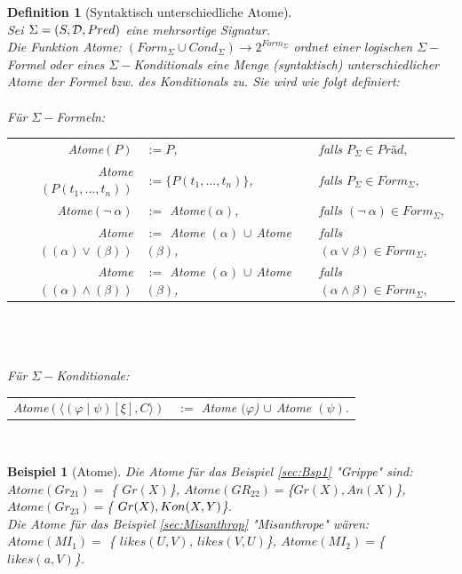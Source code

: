 \documentclass[draft]{scrreprt}
\newtheorem{Def}{Definition }[section]
\newtheorem{Bsp}{Beispiel}[section]
\begin{document}
\begin{Def}[Syntaktisch unterschiedliche Atome]\cite[Kap. 6.2., \\S. 131/132, Def. 6.2.12]{Fis10}\\
Sei $ \Sigma = (S, {\cal D}, Pred) $ eine mehrsortige Signatur.\\
Die Funktion Atome: $ (Form_{\Sigma} \cup Cond_{\Sigma}) \rightarrow 2^{Form_{\Sigma}}$ ordnet einer logischen $ \Sigma- $Formel oder eines $ \Sigma- $Konditionals eine Menge (syntaktisch) unterschiedlicher Atome der Formel bzw. des Konditionals zu.
Sie wird wie folgt definiert:\\
\\Für $ \Sigma- $Formeln: 

\begin{tabular}{rll}
Atome$ (P) $ & $ := {P} $, & falls $ P_{\Sigma} \in Präd,$ \\
Atome$ (P(t_1, ..., t_n)) $ & $ := \{P(t_1, ..., t_n)\} $, & falls $ P_{\Sigma} \in Form_{\Sigma},$ \\
Atome$ (\neg ~ \alpha) $ & $ := $ Atome$ (\alpha) $, & falls $ (\neg ~ \alpha) \in Form_{\Sigma},$ \\
Atome$ ((\alpha) \vee (\beta)) $ & $ := $ Atome $ (\alpha) $  $ \cup$ Atome $ (\beta) $, & falls $ (\alpha \vee \beta) \in Form_{\Sigma},$ \\
Atome$ ((\alpha) \wedge (\beta)) $ & $ := $ Atome $ (\alpha) $  $ \cup$ Atome $ (\beta) $, & falls $ (\alpha \wedge \beta) \in Form_{\Sigma},$ \\
\end{tabular}\\ 
\\
\\
Für $ \Sigma- $Konditionale:

\begin{tabular}{rl}
Atome$(  \langle (\varphi \mid \psi)[\xi], C \rangle) $ & $ :=   $ Atome $ (\varphi$) $ \cup $  Atome $ (\psi ).$ \\
\end{tabular}
\\
\end{Def}


\begin{Bsp}[Atome]
Die Atome für das Beispiel \ref{sec:Bsp1} "{}Grippe"{}  sind:\\
$ Atome(Gr_{21}) = $  \{ $Gr(X) $\}, $ Atome(GR_{22}) = $\{$Gr(X), An(X)$\},  $Atome(Gr_{23}) = $\{ $Gr(X), \\ Kon(X, Y) $\}. \\

Die Atome für das Beispiel \ref{sec:Misanthrop} "{}Misanthrope"{} wären:\\
$ Atome(MI_{1}) = $  \{ $likes(U, V) $, $likes(V, U) $\}, $Atome(MI_{2}) = $\{ $likes(a, V)  $\}. \\
\\
\end{Bsp}
\end{document}
